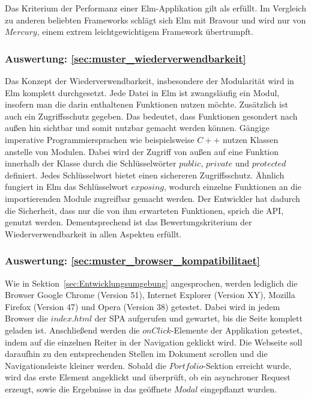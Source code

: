 Das Kriterium der Performanz einer Elm-Applikation gilt als erfüllt. Im Vergleich zu anderen beliebten Frameworks schlägt sich Elm mit Bravour und wird nur von $Mercury$, einem extrem leichtgewichtigem Framework übertrumpft.

\subsubsection{Auswertung: \ref{sec:muster_wiederverwendbarkeit} }
Das Konzept der Wiederverwendbarkeit, insbesondere der Modularität wird in Elm komplett durchgesetzt. Jede Datei in Elm ist zwangsläufig ein Modul, insofern man die darin enthaltenen Funktionen nutzen möchte. Zusätzlich ist auch ein Zugriffsschutz gegeben. Das bedeutet, dass Funktionen gesondert nach außen hin sichtbar und somit nutzbar gemacht werden können. Gängige imperative Programmiersprachen wie beispielsweise $C++$ nutzen Klassen anstelle von Modulen. Dabei wird der Zugriff von außen auf eine Funktion innerhalb der Klasse durch die Schlüsselwörter $public$, $private$ und $protected$ definiert. Jedes Schlüsselwort bietet einen sichereren Zugriffsschutz. Ähnlich fungiert in Elm das Schlüsselwort $exposing$, wodurch einzelne Funktionen an die importierenden Module zugreifbar gemacht werden. Der Entwickler hat dadurch die Sicherheit, dass nur die von ihm erwarteten Funktionen, sprich die \ac{API}, genutzt werden. Dementsprechend ist das Bewertungskriterium der Wiederverwendbarkeit in allen Aspekten erfüllt.


\subsubsection{Auswertung: \ref{sec:muster_browser_kompatibilitaet} }
Wie in Sektion~\ref{sec:Entwicklungsumgebung} angesprochen, werden lediglich die Browser Google Chrome (Version 51), Internet Explorer (Version XY), Mozilla Firefox (Version 47) und Opera (Version 38) getestet. Dabei wird in jedem Browser die $index.html$ der \ac{SPA} aufgerufen und gewartet, bis die Seite komplett geladen ist. Anschließend werden die $onClick$-Elemente der Applikation getestet, indem auf die einzelnen Reiter in der Navigation geklickt wird. Die Webseite soll daraufhin zu den entsprechenden Stellen im Dokument scrollen und die Navigationsleiste kleiner werden. Sobald die $Portfolio$-Sektion erreicht wurde, wird das erste Element angeklickt und überprüft, ob ein asynchroner Request erzeugt, sowie die Ergebnisse in das geöffnete $Modal$ eingepflanzt wurden.

